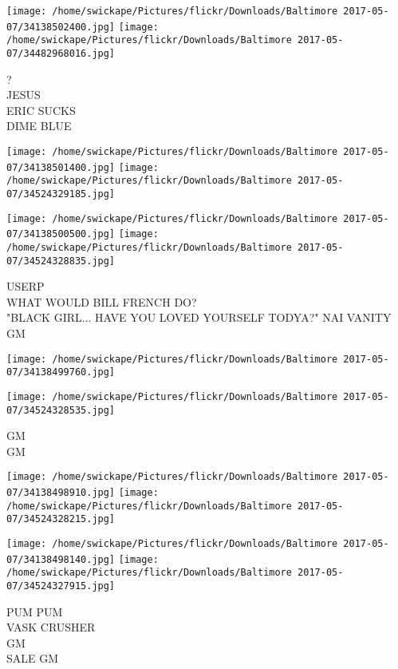 \documentclass[10pt,letterpaper]{article}
\begin{document}
\texttt{[image: /home/swickape/Pictures/flickr/Downloads/Baltimore 2017-05-07/34138502400.jpg]}
\texttt{[image: /home/swickape/Pictures/flickr/Downloads/Baltimore 2017-05-07/34482968016.jpg]}

?\\
JESUS\\
ERIC SUCKS\\
DIME BLUE\\
\pagebreak

\texttt{[image: /home/swickape/Pictures/flickr/Downloads/Baltimore 2017-05-07/34138501400.jpg]}
\texttt{[image: /home/swickape/Pictures/flickr/Downloads/Baltimore 2017-05-07/34524329185.jpg]}

\texttt{[image: /home/swickape/Pictures/flickr/Downloads/Baltimore 2017-05-07/34138500500.jpg]}
\texttt{[image: /home/swickape/Pictures/flickr/Downloads/Baltimore 2017-05-07/34524328835.jpg]}

USERP\\
WHAT WOULD BILL FRENCH DO?\\
"BLACK GIRL... HAVE YOU LOVED YOURSELF TODYA?"  NAI VANITY\\
GM\\
\pagebreak

\texttt{[image: /home/swickape/Pictures/flickr/Downloads/Baltimore 2017-05-07/34138499760.jpg]}

\vspace{0.25in}
\texttt{[image: /home/swickape/Pictures/flickr/Downloads/Baltimore 2017-05-07/34524328535.jpg]}

GM\\
GM\\
\pagebreak

\texttt{[image: /home/swickape/Pictures/flickr/Downloads/Baltimore 2017-05-07/34138498910.jpg]}
\texttt{[image: /home/swickape/Pictures/flickr/Downloads/Baltimore 2017-05-07/34524328215.jpg]}

\texttt{[image: /home/swickape/Pictures/flickr/Downloads/Baltimore 2017-05-07/34138498140.jpg]}
\texttt{[image: /home/swickape/Pictures/flickr/Downloads/Baltimore 2017-05-07/34524327915.jpg]}

PUM PUM\\
VASK CRUSHER\\
GM\\
SALE GM\\
\pagebreak
\end{document}
